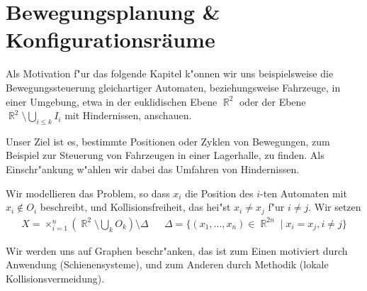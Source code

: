 \documentclass[paper=A4, twoside, chapterprefix=true, bibliography=totoc, headsepline]{scrbook}
\newcommand{\tikzgitter}[3][0.25]{ %
	\draw[step=#1,gray!15] #2 grid #3;
	\draw[step=2*#1,gray!30] #2 grid #3;
	\fill (0,0) circle(0.1); 
}
\DeclareMathOperator{\R}{\mathbb{R}}
\theoremstyle{break}
\theoremstyle{nonumberbreak}
\theoremstyle{emptybreak}
\theoremstyle{break}
\begin{document}

\chapter{Bewegungsplanung \& Konfigurationsr\"aume}

Als Motivation f"ur das folgende Kapitel k"onnen wir uns beispielsweise die Bewegungssteuerung gleichartiger Automaten, beziehungsweise Fahrzeuge, in einer Umgebung, etwa in der euklidischen Ebene $\R^2$ oder der Ebene $\R^2 \setminus \bigcup_{i \le k} I_i$ mit Hindernissen, anschauen.

Unser Ziel ist es, bestimmte Positionen oder Zyklen von Bewegungen, zum Beispiel zur Steuerung von Fahrzeugen in einer Lagerhalle, zu finden.
Als Einschr"ankung w"ahlen wir dabei das Umfahren von Hindernissen.

Wir modellieren das Problem, so dass $x_i$ die Position des $i$-ten Automaten mit $x_i \notin O_i$ beschreibt, und Kollisionsfreiheit, das hei"st $x_i \ne x_j$ f"ur $i \ne j$.
Wir setzen
\begin{align*}
	X = \times_{i=1}^{n} (\R^2 \setminus \bigcup_k O_k ) \setminus \Delta && \Delta = \{(x_1, \ldots, x_n) \in \R^{2n} \mid x_i = x_j, i \ne j \}
\end{align*}

Wir werden uns auf Graphen beschr"anken, das ist zum Einen motiviert durch Anwendung (Schienensysteme), und zum Anderen durch Methodik (lokale Kollisionsvermeidung).
\end{document}
